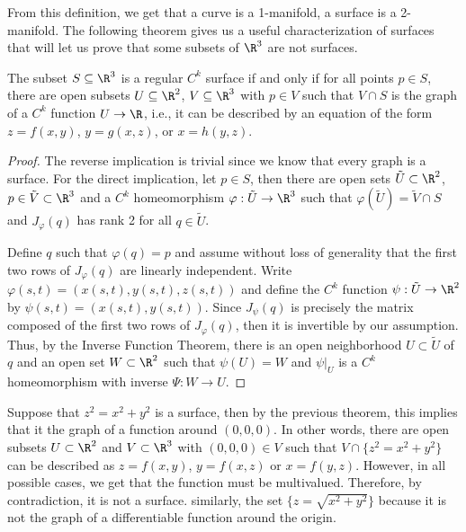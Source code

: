 From this definition, we get that a curve is a 1-manifold, a surface is a 2-manifold. The following theorem gives us a useful characterization of surfaces that will let us prove that some subsets of $\R^3$ are not surfaces.

\begin{theorem}
    The subset $S \subseteq \R^3$ is a regular $C^k$ surface if and only if for all points $p \in S$, there are open subsets $U \subseteq \R^2$, $V \subseteq \R^3$ with $p \in V$ such that $V \cap S$ is the graph of a $C^k$ function $U \to \R$, i.e., it can be described by an equation of the form $z = f(x,y)$, $y = g(x,z)$, or $x = h(y,z)$.
\end{theorem}

\begin{proof}
    The reverse implication is trivial since we know that every graph is a surface. For the direct implication, let $p \in S$, then there are open sets $\tilde{U} \subset \R^2$, $p \in \tilde{V} \subset \R^3$ and a $C^k$ homeomorphism $\varphi : \tilde{U} \to \R^3$ such that $\varphi(\tilde{U}) = \tilde{V}\cap S$ and $J_{\varphi}(q)$ has rank 2 for all $q \in \tilde{U}$.
    
    Define $q$ such that $\varphi(q) = p$ and assume without loss of generality that the first two rows of $J_{\varphi}(q)$ are linearly independent. Write $\varphi(s,t) = (x(s,t), y(s,t), z(s,t))$ and define the $C^k$ function $\psi : \tilde{U} \to \R^2$ by $\psi(s,t) = (x(s,t), y(s,t))$. Since $J_{\psi}(q)$ is precisely the matrix composed of the first two rows of $J_{\varphi}(q)$, then it is invertible by our assumption. Thus, by the Inverse Function Theorem, there is an open neighborhood $U \subset \tilde{U}$ of $q$ and an open set $W \subset \R^2$ such that $\psi(U) = W$ and $\psi|_U$ is a $C^k$ homeomorphism with inverse $\Psi : W \to U$. \td
\end{proof}

Suppose that $z^2 = x^2 + y^2$ is a surface, then by the previous theorem, this implies that it the graph of a function around $(0,0,0)$. In other words, there are open subsets $U \subset \R^2$ and $V \subset \R^3$ with $(0,0,0) \in V$ such that $V \cap \{z^2 = x^2 + y^2\}$ can be described as $z = f(x,y)$, $y = f(x,z)$ or $x = f(y,z)$. However, in all possible cases, we get that the function must be multivalued. Therefore, by contradiction, it is not a surface. similarly, the set $\{z = \sqrt{x^2 + y^2}\}$ because it is not the graph of a differentiable function around the origin.

